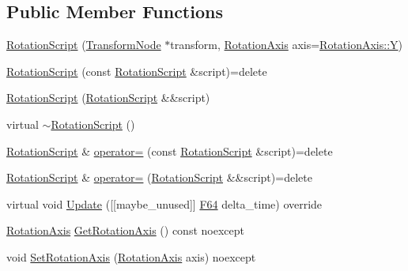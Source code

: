 \subsection*{Public Member Functions}
\begin{DoxyCompactItemize}
\item 
\hyperlink{classmage_1_1_rotation_script_a731c7c3dbe7064fe876f80307952b595}{Rotation\+Script} (\hyperlink{classmage_1_1_transform_node}{Transform\+Node} $\ast$transform, \hyperlink{classmage_1_1_rotation_script_ad06cf896ce6dfe4f6676b263d15b4ee9}{Rotation\+Axis} axis=\hyperlink{classmage_1_1_rotation_script_ad06cf896ce6dfe4f6676b263d15b4ee9a57cec4137b614c87cb4e24a3d003a3e0}{Rotation\+Axis\+::Y})
\item 
\hyperlink{classmage_1_1_rotation_script_a52ee0473609565766fc1153678ee8b60}{Rotation\+Script} (const \hyperlink{classmage_1_1_rotation_script}{Rotation\+Script} \&script)=delete
\item 
\hyperlink{classmage_1_1_rotation_script_a5c6464f8e38fde0442c3b6f49a9cbed1}{Rotation\+Script} (\hyperlink{classmage_1_1_rotation_script}{Rotation\+Script} \&\&script)
\item 
virtual \hyperlink{classmage_1_1_rotation_script_adc2af2d6ed93558fd66b569297b294d0}{$\sim$\+Rotation\+Script} ()
\item 
\hyperlink{classmage_1_1_rotation_script}{Rotation\+Script} \& \hyperlink{classmage_1_1_rotation_script_a738c666a1aa42412da82d24368b20dfe}{operator=} (const \hyperlink{classmage_1_1_rotation_script}{Rotation\+Script} \&script)=delete
\item 
\hyperlink{classmage_1_1_rotation_script}{Rotation\+Script} \& \hyperlink{classmage_1_1_rotation_script_a093aa3f50dcbbe68847bb0b5f6363e7a}{operator=} (\hyperlink{classmage_1_1_rotation_script}{Rotation\+Script} \&\&script)=delete
\item 
virtual void \hyperlink{classmage_1_1_rotation_script_a93d00e047d8ca3075d2c52209c769761}{Update} (\mbox{[}\mbox{[}maybe\+\_\+unused\mbox{]}\mbox{]} \hyperlink{namespacemage_ad26233bbec640deda836e572c1a23708}{F64} delta\+\_\+time) override
\item 
\hyperlink{classmage_1_1_rotation_script_ad06cf896ce6dfe4f6676b263d15b4ee9}{Rotation\+Axis} \hyperlink{classmage_1_1_rotation_script_a6fbbbec1bd610da2c917d1ef2d05f556}{Get\+Rotation\+Axis} () const noexcept
\item 
void \hyperlink{classmage_1_1_rotation_script_a32c12db9206002a1aa2dd0e2e3b4ecd7}{Set\+Rotation\+Axis} (\hyperlink{classmage_1_1_rotation_script_ad06cf896ce6dfe4f6676b263d15b4ee9}{Rotation\+Axis} axis) noexcept
\end{DoxyCompactItemize}
